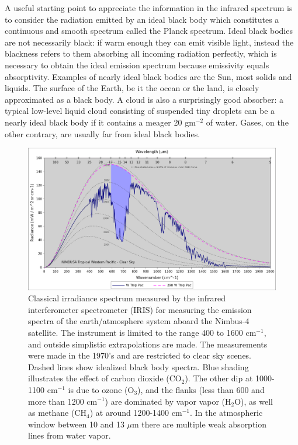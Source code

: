\documentclass[12pt]{book}
\begin{document}
A useful starting point to appreciate the information in the infrared spectrum is to consider the radiation emitted by an ideal black body which constitutes a continuous and smooth spectrum called the Planck spectrum. Ideal black bodies are not necessarily black: if warm enough they can emit visible light, instead the blackness refers to them absorbing all incoming radiation perfectly, which is necessary to obtain the ideal emission spectrum because emissivity equals absorptivity. Examples of nearly ideal black bodies are the Sun, most solids and liquids. The surface of the Earth, be it the ocean or the land, is closely approximated as a black body. A cloud is also a surprisingly good absorber: a typical low-level liquid cloud consisting of suspended tiny droplets can be a nearly ideal black body if it contains a meager 20 gm$^{-2}$ of water. Gases, on the other contrary, are usually far from ideal black bodies. 

\begin{figure}
\begin{center}
\includegraphics[width=17 cm]{../external_figures/GW_Petty_IRIS_Tropical_Western_Pacific.png}
\end{center}
\caption{ Classical irradiance spectrum measured by the infrared interferometer spectrometer (IRIS) for measuring the emission spectra of the earth/atmosphere system aboard the Nimbus-4 satellite. The instrument is limited to the range 400 to 1600 cm$^{-1}$, and outside simplistic extrapolations are made. The measurements were made in the 1970's and are restricted to clear sky scenes. Dashed lines show idealized black body spectra. Blue shading illustrates the effect of carbon dioxide (CO$_2$). The other dip at 1000-1100 cm$^{-1}$ is due to ozone (O$_3$), and the flanks (less than 600 and more than 1200 cm$^{-1}$) are dominated by vapor vapor (H$_2$O), as well as methane (CH$_4$) at around 1200-1400 cm$^{-1}$. In the atmospheric window between 10 and 13 $\mu$m there are multiple weak absorption lines from water vapor. } 
\label{fig:radiation_spectrum}
\end{figure}
\end{document}
